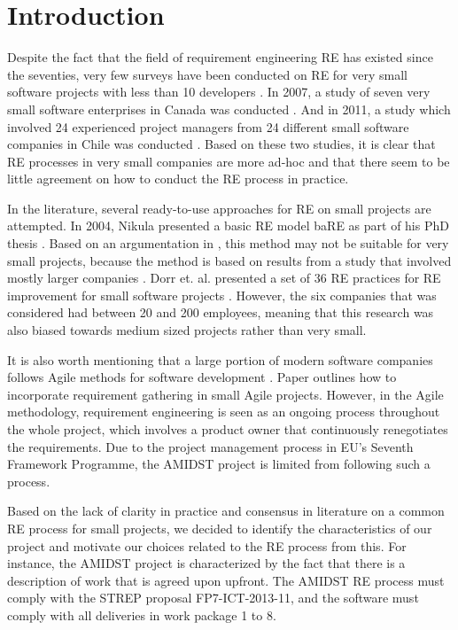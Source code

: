 \section{Introduction}

Despite the fact that the field of requirement engineering RE has existed since the seventies, very few surveys have been conducted on RE for very small software projects with less than 10 developers \cite{Qui10}. In 2007, a study of seven very small software enterprises in Canada was conducted \cite{Ara07}.
And in 2011, a study which involved 24 experienced project managers from 24 different small software companies in Chile was conducted \cite{Qui10}.  Based on these two studies, it is clear that RE processes in very small companies are more ad-hoc and that there seem to be little agreement on how to conduct the RE process in practice.

In the literature, several ready-to-use approaches for RE on small projects are attempted.  In 2004, Nikula presented a basic RE model baRE as part of his PhD thesis \cite{Nik04}.  Based on an argumentation in \cite{Qui10}, this method may not be suitable for very small projects, because the method is based on results from a study that involved mostly larger companies \cite{Nik00}.   Dorr et. al. presented a set of 36 RE practices for RE improvement for small software projects \cite{Dor08}.  However, the six companies that was considered had between 20 and 200 employees, meaning that this research was also biased towards medium sized projects rather than very small. 

It is also worth mentioning that a large portion of modern software companies follows Agile methods for software development \cite{Din10}.  Paper \cite{Kav11} outlines how to incorporate requirement gathering in small Agile projects.  However, in the Agile methodology, requirement engineering is seen as an ongoing process throughout the whole project, which involves a product owner that continuously renegotiates the requirements.  Due to the project management process in EU's Seventh Framework Programme, the AMIDST project is limited from following such a process. 

Based on the lack of clarity in practice and consensus in literature on a common RE process for small projects, we decided to identify the characteristics of our project and motivate our choices related to the RE process from this.  For instance, the AMIDST project is characterized by the fact that there is a description of work that is agreed upon upfront.  The 
AMIDST RE process must comply with the STREP proposal FP7-ICT-2013-11, and the software must comply with all deliveries in work package 1 to 8. 

